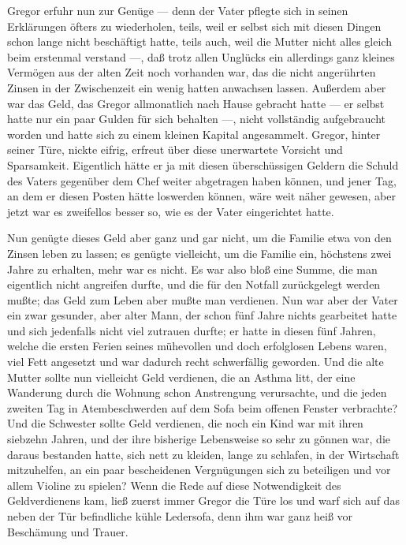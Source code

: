Gregor erfuhr nun zur Genüge --- denn der Vater pflegte sich in seinen
Erklärungen öfters zu wiederholen, teils, weil er selbst sich mit diesen
Dingen schon lange nicht beschäftigt hatte, teils auch, weil die Mutter
nicht alles gleich beim erstenmal verstand ---, daß trotz allen Unglücks
ein allerdings ganz kleines Vermögen aus der alten Zeit noch vorhanden
war, das die nicht angerührten Zinsen in der Zwischenzeit ein wenig
hatten anwachsen lassen. Außerdem aber war das Geld, das Gregor
allmonatlich nach Hause gebracht hatte --- er selbst hatte nur ein paar
Gulden für sich behalten ---, nicht vollständig aufgebraucht worden und
hatte sich zu einem kleinen Kapital angesammelt. Gregor, hinter seiner
Türe, nickte eifrig, erfreut über diese unerwartete Vorsicht und
Sparsamkeit. Eigentlich hätte er ja mit diesen überschüssigen Geldern
die Schuld des Vaters gegenüber dem Chef weiter abgetragen haben können,
und jener Tag, an dem er diesen Posten hätte loswerden können, wäre weit
näher gewesen, aber jetzt war es zweifellos besser so, wie es der Vater
eingerichtet hatte.

Nun genügte dieses Geld aber ganz und gar nicht, um die Familie etwa von
den Zinsen leben zu lassen; es genügte vielleicht, um die Familie ein,
höchstens zwei Jahre zu erhalten, mehr war es nicht. Es war also bloß
eine Summe, die man eigentlich nicht angreifen durfte, und die für den
Notfall zurückgelegt werden mußte; das Geld zum Leben aber mußte man
verdienen. Nun war aber der Vater ein zwar gesunder, aber alter Mann,
der schon fünf Jahre nichts gearbeitet hatte und sich jedenfalls nicht
viel zutrauen durfte; er hatte in diesen fünf Jahren, welche die ersten
Ferien seines mühevollen und doch erfolglosen Lebens waren, viel Fett
angesetzt und war dadurch recht schwerfällig geworden. Und die alte
Mutter sollte nun vielleicht Geld verdienen, die an Asthma litt, der
eine Wanderung durch die Wohnung schon Anstrengung verursachte, und die
jeden zweiten Tag in Atembeschwerden auf dem Sofa beim offenen Fenster
verbrachte? Und die Schwester sollte Geld verdienen, die noch ein Kind
war mit ihren siebzehn Jahren, und der ihre bisherige Lebensweise so
sehr zu gönnen war, die daraus bestanden hatte, sich nett zu kleiden,
lange zu schlafen, in der Wirtschaft mitzuhelfen, an ein paar
bescheidenen Vergnügungen sich zu beteiligen und vor allem Violine zu
spielen? Wenn die Rede auf diese Notwendigkeit des Geldverdienens kam,
ließ zuerst immer Gregor die Türe los und warf sich auf das neben der
Tür befindliche kühle Ledersofa, denn ihm war ganz heiß vor Beschämung
und Trauer.

